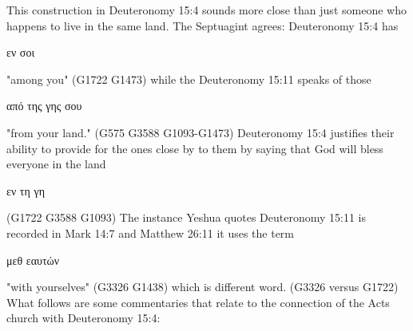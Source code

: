 \documentclass[11pt]{article}
\begin{document}
This construction in Deuteronomy 15:4 sounds more close than just someone who happens to live in the same land. The Septuagint agrees: Deuteronomy 15:4 has \begin{greek}εν σοι\end{greek}  "among you" (G1722 G1473) while the Deuteronomy 15:11 speaks of those \begin{greek} από της γης σου \end{greek} "from your land." (G575 G3588 G1093-G1473) Deuteronomy 15:4 justifies their ability to provide for the ones close by to them by saying that God will bless everyone in the land \begin{greek}εν τη γη\end{greek} (G1722 G3588 G1093) The instance Yeshua quotes Deuteronomy 15:11 is recorded in Mark 14:7 and Matthew 26:11 it uses the term \begin{greek} μεθ εαυτών \end{greek} "with yourselves" (G3326 G1438) which is different word. (G3326 versus G1722)
%
What follows are some commentaries that relate to the connection of the Acts church with Deuteronomy 15:4:\newline
\end{document}
